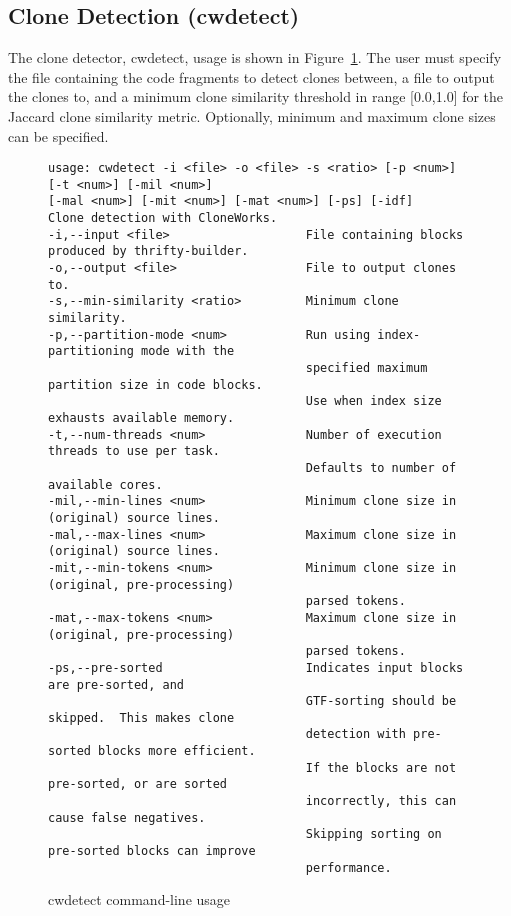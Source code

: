 \documentclass[]{article}
\begin{document}
	\subsection{Clone Detection (cwdetect)}
	The clone detector, cwdetect, usage is shown in Figure~\ref{fig:cwdetectuse}.  The user must specify the file containing the code fragments to detect clones between, a file to output the clones to, and a minimum clone similarity threshold in range [0.0,1.0] for the Jaccard clone similarity metric.  Optionally, minimum and maximum clone sizes can be specified.
	
\begin{figure}
	\caption{cwdetect command-line usage}\label{fig:cwdetectuse}
\begin{verbatim}
usage: cwdetect -i <file> -o <file> -s <ratio> [-p <num>] [-t <num>] [-mil <num>]
[-mal <num>] [-mit <num>] [-mat <num>] [-ps] [-idf]
Clone detection with CloneWorks.
-i,--input <file>                   File containing blocks produced by thrifty-builder.
-o,--output <file>                  File to output clones to.
-s,--min-similarity <ratio>         Minimum clone similarity.
-p,--partition-mode <num>           Run using index-partitioning mode with the
                                    specified maximum partition size in code blocks.
                                    Use when index size exhausts available memory.
-t,--num-threads <num>              Number of execution threads to use per task.
                                    Defaults to number of available cores.
-mil,--min-lines <num>              Minimum clone size in (original) source lines.
-mal,--max-lines <num>              Maximum clone size in (original) source lines.
-mit,--min-tokens <num>             Minimum clone size in (original, pre-processing)
                                    parsed tokens.
-mat,--max-tokens <num>             Maximum clone size in (original, pre-processing)
                                    parsed tokens.
-ps,--pre-sorted                    Indicates input blocks are pre-sorted, and 
                                    GTF-sorting should be skipped.  This makes clone 
                                    detection with pre-sorted blocks more efficient.
                                    If the blocks are not pre-sorted, or are sorted 
                                    incorrectly, this can cause false negatives.
                                    Skipping sorting on pre-sorted blocks can improve 
                                    performance.
\end{verbatim}
\end{figure}
	
\end{document}
